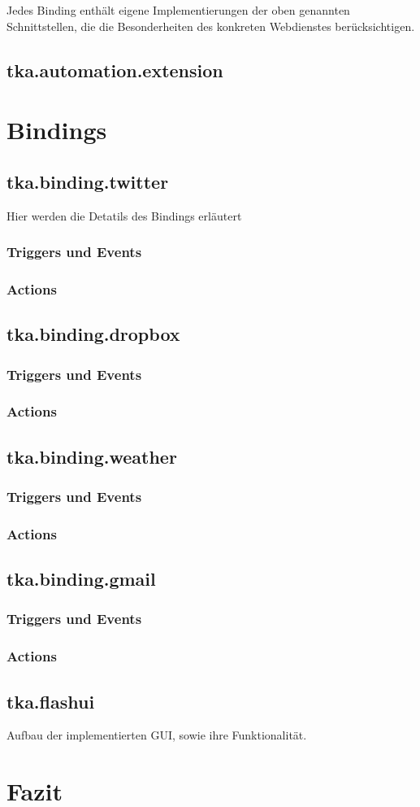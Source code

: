Jedes Binding enthält eigene Implementierungen der oben genannten Schnittstellen, die die Besonderheiten des konkreten Webdienstes berücksichtigen.


\subsection{tka.automation.extension}



\section{Bindings}
\label{sec:bindings_impl}


\subsection{tka.binding.twitter}
Hier werden die Detatils des Bindings erläutert
\subsubsection{Triggers und Events}
\subsubsection{Actions}

\subsection{tka.binding.dropbox}
\subsubsection{Triggers und Events}
\subsubsection{Actions}

\subsection{tka.binding.weather}
\subsubsection{Triggers und Events}
\subsubsection{Actions}

\subsection{tka.binding.gmail}
\subsubsection{Triggers und Events}
\subsubsection{Actions}

\subsection{tka.flashui}
Aufbau der implementierten GUI, sowie ihre Funktionalität.

\section{Fazit}